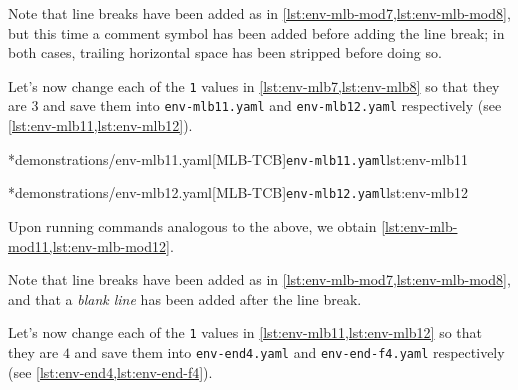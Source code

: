 		Note that line breaks have been added as in \cref{lst:env-mlb-mod7,lst:env-mlb-mod8}, but
		this time a comment symbol has been added before adding the line break; in both cases,
		trailing horizontal space has been stripped before doing so.

		Let's%
		 now change each of the \texttt{1} values in
		\cref{lst:env-mlb7,lst:env-mlb8} so that they are $3$ and save them into
		\texttt{env-mlb11.yaml} and \texttt{env-mlb12.yaml} respectively (see
		\cref{lst:env-mlb11,lst:env-mlb12}).

		\begin{minipage}{.49\textwidth}
			\cmhlistingsfromfile[style=yaml-LST]*{demonstrations/env-mlb11.yaml}[MLB-TCB]{\texttt{env-mlb11.yaml}}{lst:env-mlb11}
		\end{minipage}
		\hfill
		\begin{minipage}{.49\textwidth}
			\cmhlistingsfromfile[style=yaml-LST]*{demonstrations/env-mlb12.yaml}[MLB-TCB]{\texttt{env-mlb12.yaml}}{lst:env-mlb12}
		\end{minipage}

		Upon running commands analogous to the above, we obtain
		\cref{lst:env-mlb-mod11,lst:env-mlb-mod12}.

		\begin{widepage}
			\begin{minipage}{.42\linewidth}
			\end{minipage}
			\hfill
			\begin{minipage}{.57\linewidth}
			\end{minipage}
		\end{widepage}

		Note that line breaks have been added as in \cref{lst:env-mlb-mod7,lst:env-mlb-mod8}, and
		that a \emph{blank line} has been added after the line break.

		Let's now change%
		 each of the \texttt{1} values in
		\cref{lst:env-mlb11,lst:env-mlb12} so that they are $4$ and save them into
		\texttt{env-end4.yaml} and \texttt{env-end-f4.yaml} respectively (see
		\cref{lst:env-end4,lst:env-end-f4}).

